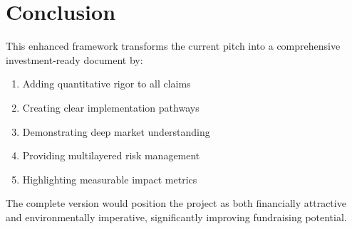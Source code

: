 \section*{Conclusion}
This enhanced framework transforms the current pitch into a comprehensive investment-ready document by:
\begin{enumerate}
\item Adding quantitative rigor to all claims
\item Creating clear implementation pathways
\item Demonstrating deep market understanding
\item Providing multilayered risk management
\item Highlighting measurable impact metrics
\end{enumerate}

The complete version would position the project as both financially attractive and environmentally imperative, significantly improving fundraising potential.
